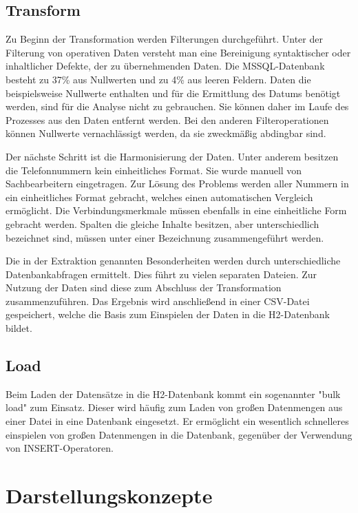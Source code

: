 \subsection{Transform}

Zu Beginn der Transformation werden Filterungen durchgeführt. Unter der Filterung von operativen Daten versteht man eine Bereinigung syntaktischer oder inhaltlicher Defekte, der zu übernehmenden Daten. Die MSSQL-Datenbank besteht zu 37\% aus Nullwerten und zu 4\% aus leeren Feldern. Daten die beispielsweise Nullwerte enthalten und für die Ermittlung des Datums benötigt werden, sind für die Analyse nicht zu gebrauchen. Sie können daher im Laufe des Prozesses aus den Daten entfernt werden. Bei den anderen Filteroperationen können Nullwerte vernachlässigt werden, da sie zweckmäßig abdingbar sind.

Der nächste Schritt ist die Harmonisierung der Daten. Unter anderem besitzen die Telefonnummern kein einheitliches Format. Sie wurde manuell von Sachbearbeitern eingetragen. Zur Lösung des Problems werden aller Nummern in ein einheitliches Format gebracht, welches einen automatischen Vergleich ermöglicht. Die Verbindungsmerkmale müssen ebenfalls in eine einheitliche Form gebracht werden. Spalten die gleiche Inhalte besitzen, aber unterschiedlich bezeichnet sind, müssen unter einer Bezeichnung zusammengeführt werden. 

Die in der Extraktion genannten Besonderheiten werden durch unterschiedliche Datenbankabfragen ermittelt. Dies führt zu vielen separaten Dateien. Zur Nutzung der Daten sind diese zum Abschluss der Transformation zusammenzuführen. Das Ergebnis wird anschließend in einer CSV-Datei gespeichert, welche die Basis zum Einspielen der Daten in die H2-Datenbank bildet. 

\subsection{Load}

Beim Laden der Datensätze in die H2-Datenbank kommt ein sogenannter "bulk load" zum Einsatz. Dieser wird häufig zum Laden von großen Datenmengen aus einer Datei in eine Datenbank eingesetzt. Er ermöglicht ein wesentlich schnelleres einspielen von großen Datenmengen in die Datenbank, gegenüber der Verwendung von INSERT-Operatoren.

\section{Darstellungskonzepte}
\label{ch:Konzeption:sec:Darstellungskonzepte}

